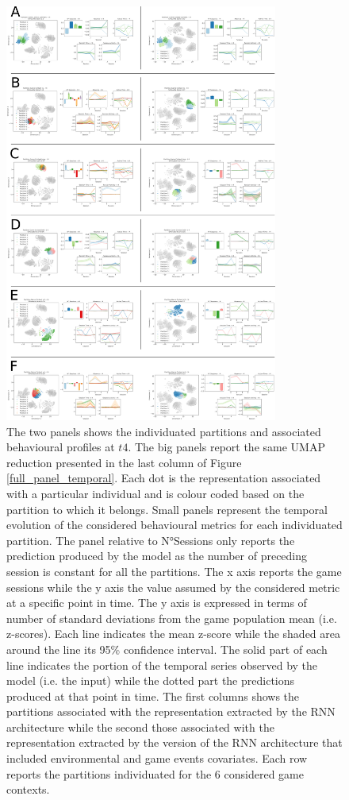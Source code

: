 \begin{figure}[ht]
\includegraphics[width=0.8\textwidth]{images/chapter_4/clust_beha_all.png}
\centering
\caption[Partitions of the representations generated by the RNN architectures from the behavioural metrics]{The two panels shows the individuated partitions and associated behavioural profiles at $t4$. The big panels report the same UMAP reduction presented in the last column of Figure \ref{full_panel_temporal}. Each dot is the representation associated with a particular individual and is colour coded based on the partition to which it belongs. Small panels represent the temporal evolution of the considered behavioural metrics for each individuated partition. The panel relative to N°Sessions only reports the prediction produced by the model as the number of preceding session is constant for all the partitions. The x axis reports the game sessions while the y axis the value assumed by the considered metric at a specific point in time. The y axis is expressed in terms of number of standard deviations from the game population mean (i.e. z-scores). Each line indicates the mean z-score while the shaded area around the line its 95\% confidence interval. The solid part of each line indicates the portion of the temporal series observed by the model (i.e. the input) while the dotted part the predictions produced at that point in time. The first columns shows the partitions associated with the representation extracted by the RNN architecture while the second those associated with the representation extracted by the version of the RNN architecture that included environmental and game events covariates. Each row reports the partitions individuated for the 6 considered game contexts.}
\label{partition_rnn_behaviour} 
\end{figure}
